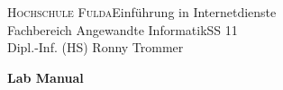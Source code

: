 \documentclass[a4paper,11pt]{article}
\begin{document}

\textsc{Hochschule Fulda}{\small\hfill Einführung in Internetdienste}\\
{\small Fachbereich Angewandte Informatik{\small\hfill SS 11}\\
Dipl.-Inf. (HS) Ronny Trommer}\\

\begin{center}
{\Large\textbf{Lab Manual}}\\

\medskip
\end{center}

\smallskip

\newcommand{\half}{{\scriptstyle\frac{1}{2}}}

\newcommand{\setK}{\mathbbm{K}}
\newcommand{\setR}{\mathbbm{R}}
\newcommand{\setZ}{\mathbbm{Z}}
\tableofcontents

\pagebreak



\end{document}
